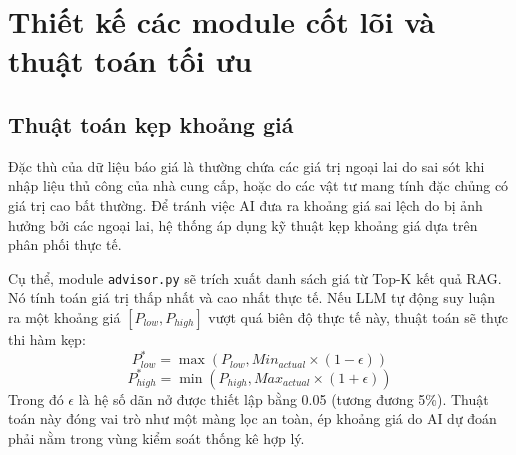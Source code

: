 \begin{table}[H]
    \centering
    \caption{Ví dụ các dòng báo giá thực tế từ kho dữ liệu hệ thống}
    \label{tab:sample_records}
\end{table}

\section{Thiết kế các module cốt lõi và thuật toán tối ưu}

\subsection{Thuật toán kẹp khoảng giá}
Đặc thù của dữ liệu báo giá là thường chứa các giá trị ngoại lai do sai sót khi nhập liệu thủ công của nhà cung cấp, hoặc do các vật tư mang tính đặc chủng có giá trị cao bất thường. Để tránh việc AI đưa ra khoảng giá sai lệch do bị ảnh hưởng bởi các ngoại lai, hệ thống áp dụng kỹ thuật kẹp khoảng giá dựa trên phân phối thực tế.

Cụ thể, module \texttt{advisor.py} sẽ trích xuất danh sách giá từ Top-K kết quả RAG. Nó tính toán giá trị thấp nhất và cao nhất thực tế. Nếu LLM tự động suy luận ra một khoảng giá $[P_{low}, P_{high}]$ vượt quá biên độ thực tế này, thuật toán sẽ thực thi hàm kẹp:
\begin{equation}
    P_{low}^* = \max(P_{low}, Min_{actual} \times (1 - \epsilon))
\end{equation}
\begin{equation}
    P_{high}^* = \min(P_{high}, Max_{actual} \times (1 + \epsilon))
\end{equation}
Trong đó $\epsilon$ là hệ số dãn nở được thiết lập bằng 0.05 (tương đương 5\%). Thuật toán này đóng vai trò như một màng lọc an toàn, ép khoảng giá do AI dự đoán phải nằm trong vùng kiểm soát thống kê hợp lý.

